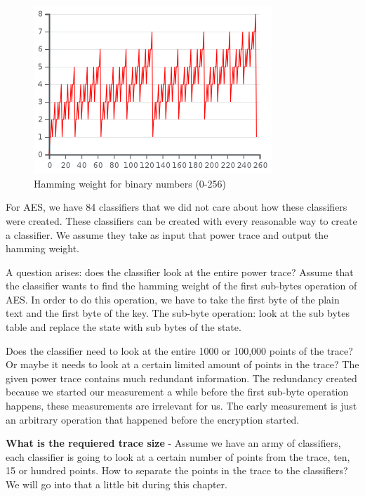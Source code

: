 \begin{figure}[!ht]
    \centering
    \includegraphics[width=0.8\textwidth]{images/Lecture6/HammingWeightBinary.png}
    \caption{Hamming weight for binary numbers (0-256)} \label{fig:HammingWeightBinary }
\end{figure}

For AES, we have 84 classifiers that we did not care about how these classifiers were created.
These classifiers can be created with every reasonable way to create a classifier.
We assume they take as input that power trace and output the hamming weight. 

A question arises: does the classifier look at the entire power trace?
Assume that the classifier wants to find the hamming weight of the first sub-bytes operation of AES.
In order to do this operation, we have to take the first byte of the plain text and the first byte of the key.
The sub-byte operation: look at the sub bytes table and replace the state with sub bytes of the state. 

Does the classifier need to look at the entire 1000 or 100,000 points of the trace?
Or maybe it needs to look at a certain limited amount of points in the trace?
The given power trace contains much redundant information.
The redundancy created because we started our measurement a while before the first sub-byte operation happens, these measurements are irrelevant for us.
The early measurement is just an arbitrary operation that happened before the encryption started.

\textbf{What is the requiered trace size} -
Assume we have an army of classifiers, each classifier is going to look at a certain number of points from the trace, ten, 15 or hundred points.
How to separate the points in the trace to the classifiers?
We will go into that a little bit during this chapter. 

